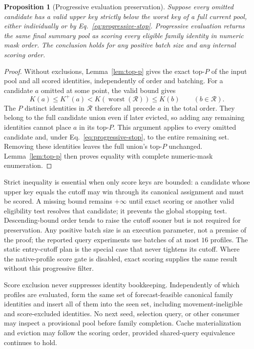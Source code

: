 \documentclass[11pt]{article}
\newtheorem{proposition}{Proposition}
\begin{document}
\begin{proposition}[Progressive evaluation preservation]\label{prop:progressive}
Suppose every omitted candidate has a valid upper key strictly below the worst key of a full current pool, either individually or by Eq.~\eqref{eq:progressive-stop}. Progressive evaluation returns the same final summary pool as scoring every eligible family identity in numeric mask order. The conclusion holds for any positive batch size and any internal scoring order.
\end{proposition}
\begin{proof}
Without exclusions, Lemma~\ref{lem:top-p} gives the exact top-$P$ of the input pool and all scored identities, independently of order and batching. For a candidate $a$ omitted at some point, the valid bound gives
\begin{equation}
 K(a)\le K^+(a)
 <K\!\left(\operatorname{worst}(\mathcal R)\right)
 \le K(b)\qquad(b\in\mathcal R).
 \label{eq:progressive-domination}
\end{equation}
The $P$ distinct identities in $\mathcal R$ therefore all precede $a$ in the total order. They belong to the full candidate union even if later evicted, so adding any remaining identities cannot place $a$ in its top-$P$. This argument applies to every omitted candidate and, under Eq.~\eqref{eq:progressive-stop}, to the entire remaining set. Removing these identities leaves the full union's top-$P$ unchanged. Lemma~\ref{lem:top-p} then proves equality with complete numeric-mask enumeration.
\end{proof}

Strict inequality is essential when only score keys are bounded: a candidate whose upper key equals the cutoff may win through its canonical assignment and must be scored. A missing bound remains $+\infty$ until exact scoring or another valid eligibility test resolves that candidate; it prevents the global stopping test. Descending-bound order tends to raise the cutoff sooner but is not required for preservation. Any positive batch size is an execution parameter, not a premise of the proof; the reported query experiments use batches of at most $16$ profiles. The static entry-cutoff plan is the special case that never tightens its cutoff. Where the native-profile score gate is disabled, exact scoring supplies the same result without this progressive filter.

Score exclusion never suppresses identity bookkeeping. Independently of which profiles are evaluated, form the same set of forecast-feasible canonical family identities and insert all of them into the seen set, including movement-ineligible and score-excluded identities. No next seed, selection query, or other consumer may inspect a provisional pool before family completion. Cache materialization and eviction may follow the scoring order, provided shared-query equivalence continues to hold.
\end{document}
